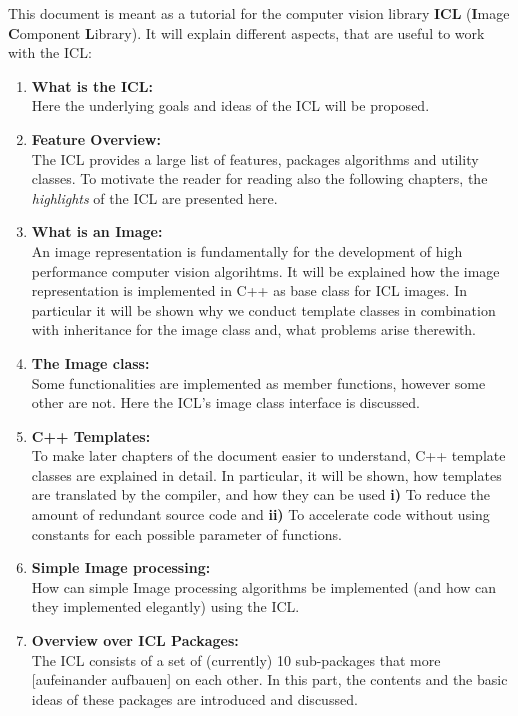 %
%

This document is meant as a tutorial for the computer vision library \textbf{ICL} (\textbf{I}mage \textbf{C}omponent \textbf{L}ibrary). It will explain different aspects, that are useful to work with the ICL:

\begin{enumerate}
\item \textbf{What is the ICL:}\\ Here the underlying goals and ideas of the ICL will be proposed.
\item \textbf{Feature Overview:}\\ The ICL provides a large list of features, packages algorithms and utility classes. To motivate the reader for reading also the following chapters, the \emph{highlights} of the ICL are presented here.
\item \textbf{What is an Image:}\\ An image representation is fundamentally for the development of high performance computer vision algorihtms. It will be explained how the image representation is implemented in C++ as base class for ICL images. In particular it will be shown why we conduct template classes in combination with inheritance for the image class and, what problems arise therewith. 
\item \textbf{The Image class:}\\ Some functionalities are implemented as member functions, however some other are not. Here the ICL's image class interface is discussed.
\item \textbf{C++ Templates:}\\ To make later chapters of the document easier to understand, C++ template classes are explained in detail. In particular, it will be shown, how templates are translated by the compiler, and how they can be used \small{\textbf{i)}} To reduce the amount of redundant source code and \small{\textbf{ii)}} To accelerate code without using constants for each possible parameter of functions.    
\item \textbf{Simple Image processing:}\\ How can simple Image processing algorithms be implemented (and how can they implemented elegantly) using the ICL.
\item \textbf{Overview over ICL Packages:}\\ The ICL consists of a set of (currently) 10 sub-packages that more [aufeinander aufbauen] on each other. In this part, the contents and the basic ideas of these packages are introduced and discussed. 

\end{enumerate}
